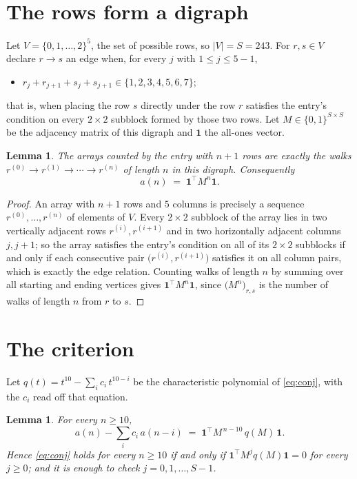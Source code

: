 \documentclass[11pt,a4paper]{article}
\theoremstyle{plain}
\newtheorem{lemma}[theorem]{Lemma}
\theoremstyle{definition}
\begin{document}
\section{The rows form a digraph}

Let $V=\{0,1,\dots,2\}^{5}$, the set of possible rows, so $|V|=S=243$. For
$r,s\in V$ declare $r\to s$ an edge when, for every $j$ with $1\le j\le 5-1$,
\begin{itemize}
\item $r_j+r_{j+1}+s_j+s_{j+1}\in\{1, 2, 3, 4, 5, 6, 7\}$;

\end{itemize}
that is, when placing the row $s$ directly under the row $r$ satisfies the entry's
condition on every $2\times2$ subblock formed by those two rows. Let $M\in\{0,1\}^{S\times
S}$ be the adjacency matrix of this digraph and $\mathbf{1}$ the all-ones vector.

\begin{lemma}\label{lem:walk}
The arrays counted by the entry with $n+1$ rows are exactly the walks
$r^{(0)}\to r^{(1)}\to\cdots\to r^{(n)}$ of length $n$ in this digraph. Consequently
\[
a(n)\;=\;\mathbf{1}^{\!\top}M^{n}\mathbf{1} .
\]
\end{lemma}

\begin{proof}
An array with $n+1$ rows and $5$ columns is precisely a sequence
$r^{(0)},\dots,r^{(n)}$ of elements of $V$. Every $2\times2$ subblock of the array lies
in two vertically adjacent rows $r^{(i)},r^{(i+1)}$ and in two horizontally adjacent
columns $j,j+1$; so the array satisfies the entry's condition on all of its $2\times2$
subblocks if and only if each consecutive pair $\bigl(r^{(i)},r^{(i+1)}\bigr)$ satisfies
it on all column pairs, which is exactly the edge relation. Counting walks of length $n$ by
summing over all starting and ending vertices gives
$\mathbf{1}^{\!\top}M^{n}\mathbf{1}$, since
$\bigl(M^{n}\bigr)_{r,s}$ is the number of walks of length $n$ from $r$ to $s$.
\end{proof}

\section{The criterion}

Let $q(t)=t^{10}-\sum_{i}c_i\,t^{10-i}$ be the characteristic polynomial of
\eqref{eq:conj}, with the $c_i$ read off that equation.

\begin{lemma}\label{lem:crit}
For every $n\ge10$,
\[
a(n)-\sum_i c_i\,a(n-i)\;=\;\mathbf{1}^{\!\top}M^{\,n-10}\,q(M)\,\mathbf{1} .
\]
Hence \eqref{eq:conj} holds for every $n\ge10$ if and only if
$\mathbf{1}^{\!\top}M^{j}q(M)\mathbf{1}=0$ for every $j\ge0$; and it is enough to
check $j=0,1,\dots,S-1$.
\end{lemma}
\end{document}
